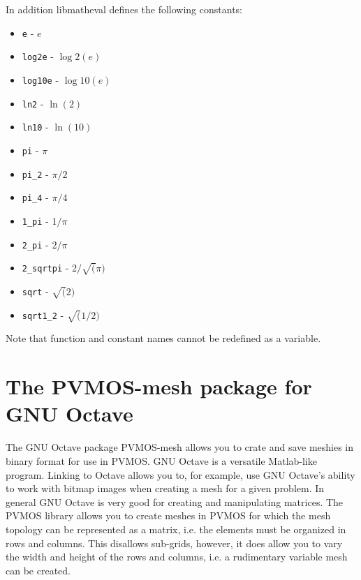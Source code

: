 \documentclass[noshowpacs,preprintnumbers,amsmath,amssymb, letter]{revtex4}
\begin{document}
In addition libmatheval defines the following constants:
\begin{itemize}
\item{} \texttt{e} - $e$
\item{} \texttt{log2e} - $\log2(e)$
\item{} \texttt{log10e} - $\log10(e)$
\item{} \texttt{ln2} - $\ln(2)$
\item{} \texttt{ln10} - $\ln(10)$
\item{} \texttt{pi} - $\pi$
\item{} \texttt{pi\_2} - $\pi / 2$
\item{} \texttt{pi\_4} - $\pi / 4$
\item{} \texttt{1\_pi} - $1 / \pi$
\item{} \texttt{2\_pi} - $2 / \pi$
\item{} \texttt{2\_sqrtpi} - $2 / \sqrt(\pi)$
\item{} \texttt{sqrt} - $\sqrt(2)$
\item{} \texttt{sqrt1\_2} - $\sqrt(1 / 2)$
\end{itemize}

Note that function and constant names cannot be redefined as a variable. 

\section{\label{mkpvmosmesh}The PVMOS-mesh package for GNU Octave}
The GNU Octave package PVMOS-mesh allows you to crate and save meshies in binary format for use in PVMOS. GNU Octave is a versatile Matlab-like program. Linking to Octave allows you to, for example, use GNU Octave's ability to work with bitmap images when creating a mesh for a given problem. In general GNU Octave is very good for creating and manipulating matrices. The PVMOS library allows you to create meshes in PVMOS for which the mesh topology can be represented as a matrix, i.e. the elements must be organized in rows and columns. This disallows sub-grids, however, it does allow you to vary the width and height of the rows and columns, i.e. a rudimentary variable mesh can be created. 
\end{document}
